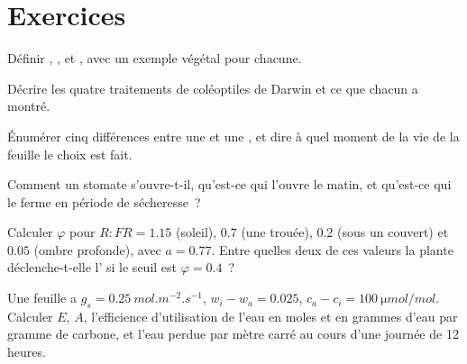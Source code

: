 \section{Exercices}

\begin{exercise}[$\star$]\label{exo:b2:plant-plasticity:1}
Définir , ,  et
, avec un exemple végétal pour chacune.
\end{exercise}

\begin{exercise}[$\star$]\label{exo:b2:plant-plasticity:2}
Décrire les quatre traitements de coléoptiles de Darwin et ce que
chacun a montré.
\end{exercise}

\begin{exercise}[$\star$]\label{exo:b2:plant-plasticity:3}
Énumérer cinq différences entre une  et une , et dire à quel moment de la vie de la feuille le choix est
fait.
\end{exercise}

\begin{exercise}[$\star$]\label{exo:b2:plant-plasticity:4}
Comment un stomate s'ouvre-t-il, qu'est-ce qui l'ouvre le matin, et
qu'est-ce qui le ferme en période de sécheresse~?
\end{exercise}

\begin{exercise}[$\star\star$]\label{exo:b2:plant-plasticity:5}
Calculer $\varphi$ pour $R{:}FR = 1.15$ (soleil), $0.7$ (une trouée),
$0.2$ (sous un couvert) et $0.05$ (ombre profonde), avec $a = 0.77$.
Entre quelles deux de ces valeurs la plante déclenche-t-elle l' si le seuil est $\varphi = 0.4$~?
\end{exercise}

\begin{exercise}[$\star\star$]\label{exo:b2:plant-plasticity:6}
Une feuille a $g_s = \qty{0.25}{mol.m^{-2}.s^{-1}}$, $w_i - w_a = 0.025$,
$c_a - c_i = \qty{100}{\micro mol/mol}$. Calculer $E$, $A$, l'efficience
d'utilisation de l'eau en moles et en grammes d'eau par gramme de
carbone, et l'eau perdue par mètre carré au cours d'une journée de
12 heures.
\end{exercise}

